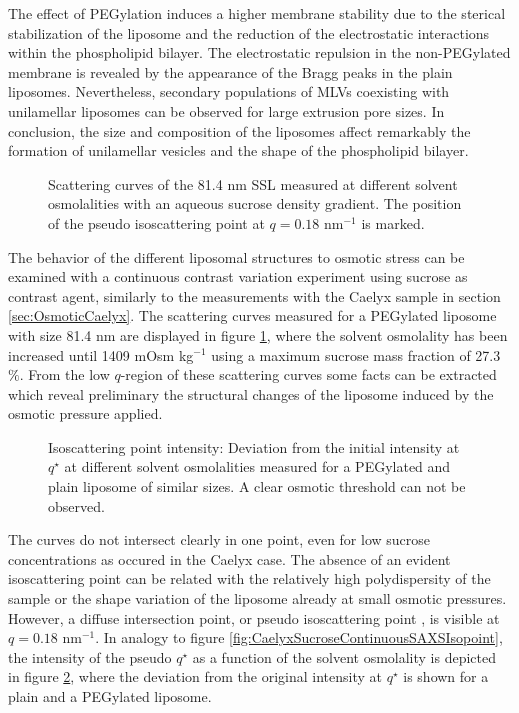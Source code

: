 The effect of PEGylation induces a higher membrane stability due to the sterical stabilization of the liposome and the reduction of the electrostatic interactions within the phospholipid bilayer. The electrostatic repulsion in the non-PEGylated membrane is revealed by the appearance of the Bragg peaks in the plain liposomes. Nevertheless, secondary populations of MLVs coexisting with unilamellar liposomes can be observed for large extrusion pore sizes. In conclusion, the size and composition of the liposomes affect remarkably the formation of unilamellar vesicles and the shape of the phospholipid bilayer.

\begin{figure}
	\centering
		
		\caption{Scattering curves of the 81.4 nm SSL measured at different solvent osmolalities with an aqueous sucrose density gradient. The position of the pseudo isoscattering point at $q=0.18$ nm$^{-1}$ is marked.}
		\label{fig:SSLContinuousSAXS}
\end{figure}

The behavior of the different liposomal structures to osmotic stress can be examined with a continuous contrast variation experiment using sucrose as contrast agent, similarly to the measurements with the Caelyx sample in section \ref{sec:OsmoticCaelyx}. The scattering curves measured for a PEGylated liposome with size 81.4 nm are displayed in figure \ref{fig:SSLContinuousSAXS}, where the solvent osmolality has been increased until 1409 mOsm kg$^{-1}$ using a maximum sucrose mass fraction of 27.3 $\%$. From the low $q$-region of these scattering curves some facts can be extracted which reveal preliminary the structural changes of the liposome induced by the osmotic pressure applied.

\begin{figure}
	\centering
		
		\caption{Isoscattering point intensity: Deviation from the initial intensity at $q^{\star}$ at different solvent osmolalities measured for a PEGylated and plain liposome of similar sizes. A clear osmotic threshold can not be observed.}
		\label{fig:SSLIsopointIntensity}
\end{figure}

The curves do not intersect clearly in one point, even for low sucrose concentrations as occured in the Caelyx case. The absence of an evident isoscattering point can be related with the relatively high polydispersity of the sample or the shape variation of the liposome already at small osmotic pressures. However, a diffuse intersection point, or pseudo isoscattering point \cite{kawaguchi_application_2004}, is visible at $q=0.18$ nm$^{-1}$. In analogy to figure \ref{fig:CaelyxSucroseContinuousSAXSIsopoint}, the intensity of the pseudo $q^{\star}$ as a function of the solvent osmolality is depicted in figure \ref{fig:SSLIsopointIntensity}, where the deviation from the original intensity at $q^{\star}$ is shown for a plain and a PEGylated liposome.


